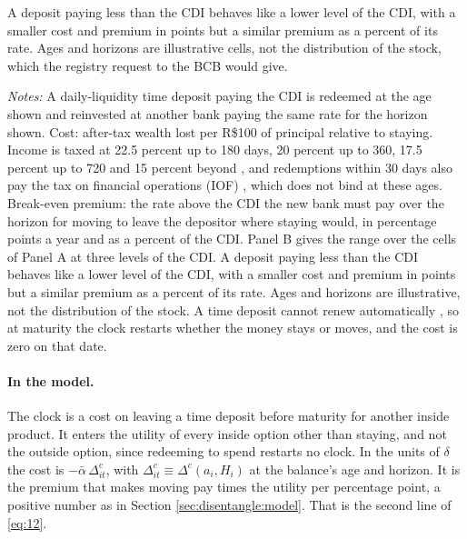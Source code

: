 A deposit paying less than the CDI behaves like a lower level of the CDI, with a smaller cost and premium in points but a similar premium as a percent of its rate. Ages and horizons are illustrative cells, not the distribution of the stock, which the registry request to the BCB would give.

\begin{table}[H]
	\centering
	\begin{threeparttable}
		\caption{The Cost of Moving a Time Deposit Before Maturity}\label{tab:tax_clock}
		
		\begin{tablenotes}[flushleft]
			\item \footnotesize \textit{Notes:} A daily-liquidity time deposit paying the CDI is redeemed at the age shown and reinvested at another bank paying the same rate for the horizon shown. Cost: after-tax wealth lost per R\$100 of principal relative to staying. Income is taxed at 22.5 percent up to 180 days, 20 percent up to 360, 17.5 percent up to 720 and 15 percent beyond \parencite{brasil_lei11033_2004}, and redemptions within 30 days also pay the tax on financial operations (IOF) \parencite{brasil_decreto6306_2007}, which does not bind at these ages. Break-even premium: the rate above the CDI the new bank must pay over the horizon for moving to leave the depositor where staying would, in percentage points a year and as a percent of the CDI. Panel B gives the range over the cells of Panel A at three levels of the CDI. A deposit paying less than the CDI behaves like a lower level of the CDI, with a smaller cost and premium in points but a similar premium as a percent of its rate. Ages and horizons are illustrative, not the distribution of the stock. A time deposit cannot renew automatically \parencite{cmn_resolucao_3454_2007,cmn_resolucao_5005_2022}, so at maturity the clock restarts whether the money stays or moves, and the cost is zero on that date.
		\end{tablenotes}
	\end{threeparttable}
\end{table}

\paragraph{In the model.} The clock is a cost on leaving a time deposit before maturity for another inside product. It enters the utility of every inside option other than staying, and not the outside option, since redeeming to spend restarts no clock. In the units of $\delta$ the cost is $-\bar{\alpha}\,\Delta^{c}_{it}$, with $\Delta^{c}_{it}\equiv\Delta^{c}(a_i,H_i)$ at the balance's age and horizon. It is the premium that makes moving pay times the utility per percentage point, a positive number as in Section \ref{sec:disentangle:model}. That is the second line of \eqref{eq:12}.

